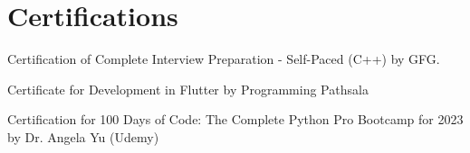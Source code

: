 \documentclass[a4paper,10pt]{article}
\def\color#1{}%
\begin{document}
\section{\color{BlueViolet} Certifications}
\begin{description}[font=$\bullet$]
\item {Certification of Complete Interview Preparation - Self-Paced (C++) by GFG.}
\vspace{-5pt}
\item {Certificate for Development in Flutter by Programming Pathsala}
\vspace{-5pt}
\item {Certification for 100 Days of Code: The Complete Python Pro Bootcamp for 2023 by Dr. Angela Yu (Udemy)}
\vspace{-5pt}
\end{description}
\end{document}
